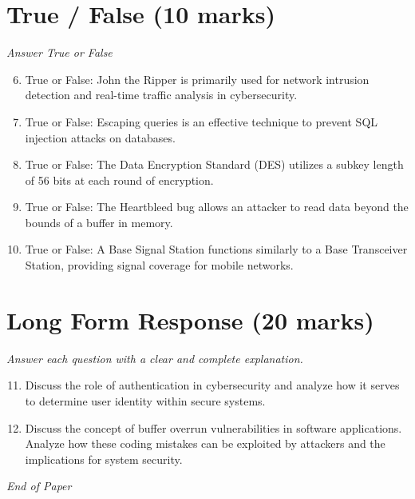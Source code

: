 \documentclass[12pt]{article}
\begin{document}
\section*{True / False (10 marks)}
\textit{Answer True or False}
\begin{enumerate}[label=\arabic*.]
\setcounter{enumi}{5}
\item True or False: John the Ripper is primarily used for network intrusion detection and real-time traffic analysis in cybersecurity.
\item True or False: Escaping queries is an effective technique to prevent SQL injection attacks on databases.
\item True or False: The Data Encryption Standard (DES) utilizes a subkey length of 56 bits at each round of encryption.
\item True or False: The Heartbleed bug allows an attacker to read data beyond the bounds of a buffer in memory.
\item True or False: A Base Signal Station functions similarly to a Base Transceiver Station, providing signal coverage for mobile networks.
\end{enumerate}

\section*{Long Form Response (20 marks)}
\textit{Answer each question with a clear and complete explanation.}
\begin{enumerate}[label=\arabic*.]
\setcounter{enumi}{10}
\item Discuss the role of authentication in cybersecurity and analyze how it serves to determine user identity within secure systems.
\item Discuss the concept of buffer overrun vulnerabilities in software applications. Analyze how these coding mistakes can be exploited by attackers and the implications for system security.
\end{enumerate}

\vfill
\noindent\textit{End of Paper}
\end{document}
